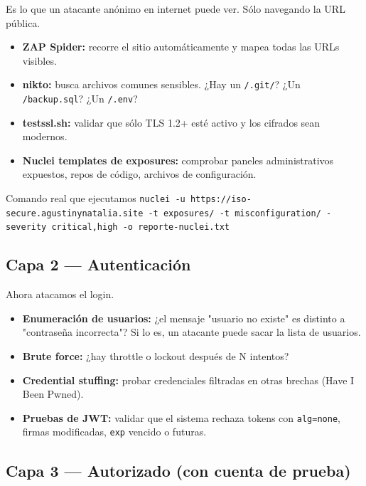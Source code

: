 \documentclass[12pt,a4paper,oneside]{article}
\begin{document}
Es lo que un atacante anónimo en internet puede ver. Sólo navegando la URL pública.

\begin{itemize}[leftmargin=*]
  \item \textbf{ZAP Spider:} recorre el sitio automáticamente y mapea todas las URLs visibles.
  \item \textbf{nikto:} busca archivos comunes sensibles. ¿Hay un \texttt{/.git/}? ¿Un \texttt{/backup.sql}? ¿Un \texttt{/.env}?
  \item \textbf{testssl.sh:} validar que sólo TLS 1.2+ esté activo y los cifrados sean modernos.
  \item \textbf{Nuclei templates de exposures:} comprobar paneles administrativos expuestos, repos de código, archivos de configuración.
\end{itemize}

\begin{infobox}{Comando real que ejecutamos}
\texttt{nuclei -u https://iso-secure.agustinynatalia.site -t exposures/ -t misconfiguration/ -severity critical,high -o reporte-nuclei.txt}
\end{infobox}

\subsection{Capa 2 --- Autenticación}

Ahora atacamos el login.

\begin{itemize}[leftmargin=*]
  \item \textbf{Enumeración de usuarios:} ¿el mensaje "usuario no existe" es distinto a "contraseña incorrecta"? Si lo es, un atacante puede sacar la lista de usuarios.
  \item \textbf{Brute force:} ¿hay throttle o lockout después de N intentos?
  \item \textbf{Credential stuffing:} probar credenciales filtradas en otras brechas (Have I Been Pwned).
  \item \textbf{Pruebas de JWT:} validar que el sistema rechaza tokens con \texttt{alg=none}, firmas modificadas, \texttt{exp} vencido o futuras.
\end{itemize}

\subsection{Capa 3 --- Autorizado (con cuenta de prueba)}
\end{document}
